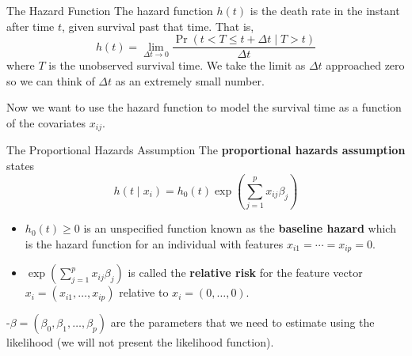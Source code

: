 \documentclass[
  ignorenonframetext,
  aspectratio=169,
]{beamer}
\begin{document}
\begin{frame}{The Hazard Function}
\protect\hypertarget{the-hazard-function}{}
The hazard function \(h(t)\) is
\alert{the death rate in the instant after time $t$, given survival past that time}.
That is,
\[h(t)=\lim _{\Delta t \rightarrow 0} \frac{\operatorname{Pr}(t<T \leq t+\Delta t \mid T>t)}{\Delta t}\]
where \(T\) is the unobserved survival time. We take the limit as
\(\Delta t\) approached zero so we can think of \(\Delta t\) as an
extremely small number.

Now we want to use the hazard function to model the survival time as a
function of the covariates \(x_{ij}\).
\end{frame}

\begin{frame}{The Proportional Hazards Assumption}
\protect\hypertarget{the-proportional-hazards-assumption}{}
The \textbf{proportional hazards assumption} states
\[h\left(t \mid x_{i}\right)=h_{0}(t) \exp \left(\sum_{j=1}^{p} x_{i j} \beta_{j}\right)\]

\begin{itemize}
\item
  \(h_0 (t) \geq 0\) is an unspecified function known as the
  \textbf{baseline hazard} which is the hazard function for an
  individual with features \(x_{i 1}=\cdots=x_{i p}=0\).
\item
  \(\exp \left(\sum_{j=1}^{p} x_{i j} \beta_{j}\right)\) is called the
  \textbf{relative risk} for the feature vector
  \(x_{i}=\left(x_{i 1}, \ldots, x_{i p}\right)\) relative to
  \(x_{i}=(0, \ldots, 0)\).
\end{itemize}

-\(\beta=\left(\beta_{0}, \beta_{1}, \ldots, \beta_{p}\right)\) are the
parameters that we need to estimate using the likelihood (we will not
present the likelihood function).
\end{frame}
\end{document}
